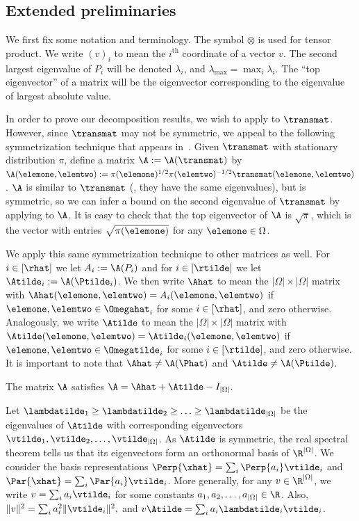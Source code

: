 \documentclass{toc}
\begin{document}
%
\subsection{Extended preliminaries}  %
\label{sec:decompPrelim}

We first fix some notation and terminology. The symbol $\otimes$ is 
used for tensor product.  We write $(v)_i$ to mean the $i^{\text{th}}$ 
coordinate of a vector $v$. The second largest eigenvalue of $P_i$ will 
be denoted $\lambda_i$, and $\lambda_{\max} = \max_i \lambda_i$. The 
``top eigenvector'' of a matrix will be the eigenvector corresponding 
to the eigenvalue of largest absolute value.

In order to prove our decomposition results, we wish to apply 
 to $\transmat$.  However, since $\transmat$ may 
not be symmetric, we appeal to the following symmetrization technique 
that appears in~\cite[p. 153]{LPW06}. Given $\transmat$ with stationary 
distribution $\pi$, define a matrix $\A := \A(\transmat)$ by 
$\A(\elemone,\elemtwo) :=\pi(\elemone)^{1/2}\pi(\elemtwo)^{-1/2}\transmat(\elemone,\elemtwo)$. 
$\A$ is similar to $\transmat$ (\ie,  they have the same eigenvalues), 
but is symmetric, so we can infer a bound on the second eigenvalue of 
$\transmat$ by applying  to $\A$. It is easy to 
check that the top eigenvector of $\A$ is $\sqrt{\pi}$, which is the 
vector with entries $\sqrt{\pi(\elemone)}$ for any $\elemone\in\Omega$. 

We apply this same symmetrization technique to other matrices as well. 
For $i \in [\rhat]$ we let $A_i := \A(P_i)$ and for $i \in 
[\rtilde]$ we let $\Atilde_i := \A(\Ptilde_i)$.  We then write $\Ahat$ 
to mean the $|\Omega| \times |\Omega|$ matrix with 
$\Ahat(\elemone,\elemtwo) = A_i(\elemone,\elemtwo)$ if 
$\elemone,\elemtwo \in \Omegahat_i$ for some $i \in [\rhat]$, and zero 
otherwise. Analogously, we write $\Atilde$ to mean the $|\Omega| \times 
|\Omega|$ matrix with $\Atilde(\elemone,\elemtwo) = 
\Atilde_i(\elemone,\elemtwo)$ if $\elemone,\elemtwo \in \Omegatilde_i$ 
for some $i \in [\rtilde]$, and zero otherwise. It is important to note 
that $\Ahat \not= \A(\Phat)$ and 
$\Atilde \not= \A(\Ptilde)$.  
\begin{proposition}\label{prop:matdecomp}
The matrix $\A$ satisfies 
$\A = \Ahat+\Atilde-I_{|\Omega|}.$
\end{proposition}

Let $\lambdatilde_1\geq\lambdatilde_2\geq\ldots\geq 
\lambdatilde_{|\Omega|}$ be the eigenvalues of $\Atilde$ with 
corresponding eigenvectors $\vtilde_1,\vtilde_2,\ldots, 
\vtilde_{|\Omega|}$.  As $\Atilde$ is symmetric, the real spectral 
theorem tells us that its eigenvectors form an orthonormal basis of 
$\R^{|\Omega|}$.  We consider the basis representations $\Perp{\xhat} = 
\sum_i\Perp{a_i}\vtilde_i$ and $\Par{\xhat} = 
\sum_i\Par{a_i}\vtilde_i$.  More generally, for any $v \in 
\R^{|\Omega|}$, we write  $v=\sum_{i}a_i\vtilde_i$ for some constants 
$a_1,a_2,\ldots, a_{|\Omega|} \in \R$.  Also, $\|v\|^2 = \sum_i 
a_i^2\|\vtilde_i\|^2,$ and $v\Atilde = \sum_i 
a_i\lambdatilde_i\vtilde_i$.
\end{document}
